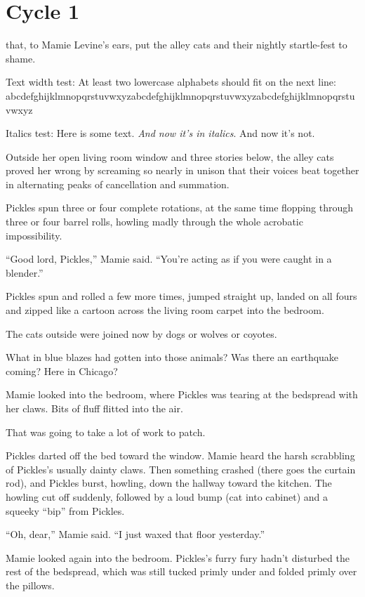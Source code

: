 \chapter{Cycle 1}


 that, to Mamie Levine's ears, put the alley cats and their nightly startle-fest to shame.

Text width test:
At least two lowercase alphabets should fit on the next line:
abcdefghijklmnopqrstuvwxyzabcdefghijklmnopqrstuvwxyzabcdefghijklmnopqrstuvwxyz

Italics test:
Here is some text. \emph{And now it's in italics}. And now it's not.

Outside her open living room window and three stories below, the alley cats proved her wrong by screaming so nearly in unison that their voices beat together in alternating peaks of cancellation and summation.

Pickles spun three or four complete rotations, at the same time flopping through three or four barrel rolls, howling madly through the whole acrobatic impossibility.

``Good lord, Pickles,'' Mamie said. ``You're acting as if you were caught in a blender.''

Pickles spun and rolled a few more times, jumped straight up, landed on all fours and zipped like a cartoon across the living room carpet into the bedroom.

The cats outside were joined now by dogs or wolves or coyotes.

What in blue blazes had gotten into those animals? Was there an earthquake coming? Here in Chicago?

Mamie looked into the bedroom, where Pickles was tearing at the bedspread with her claws. Bits of fluff flitted into the air.

That was going to take a lot of work to patch.

Pickles darted off the bed toward the window. Mamie heard the harsh scrabbling of Pickles's usually dainty claws. Then something crashed (there goes the curtain rod), and Pickles burst, howling, down the hallway toward the kitchen. The howling cut off suddenly, followed by a loud bump (cat into cabinet) and a squeeky ``bip'' from Pickles.

``Oh, dear,'' Mamie said. ``I just waxed that floor yesterday.''

Mamie looked again into the bedroom. Pickles's furry fury hadn't disturbed the rest of the bedspread, which was still tucked primly under and folded primly over the pillows.

